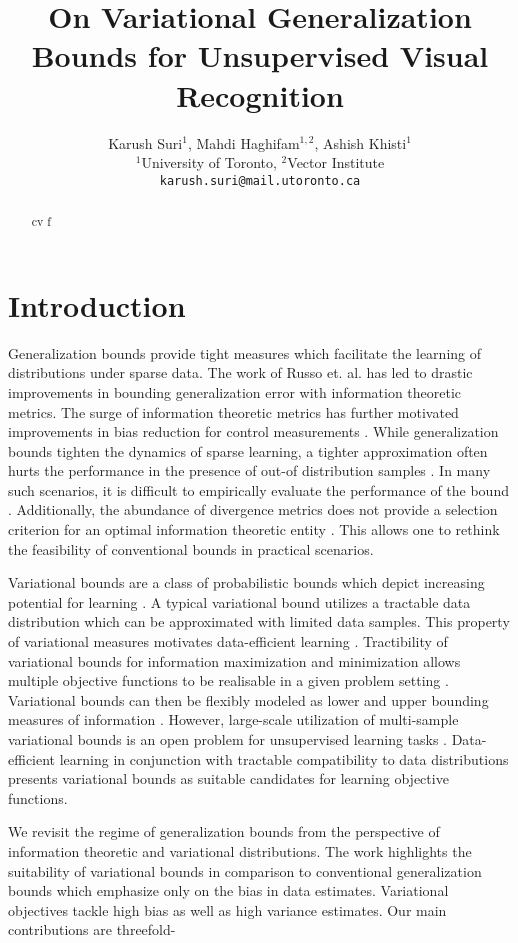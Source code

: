 \documentclass{article}
\title{On Variational Generalization Bounds for Unsupervised Visual Recognition}
\author{
  Karush Suri$^{1}$, Mahdi Haghifam$^{1,2}$, Ashish Khisti$^{1}$\\
   $^{1}$University of Toronto, $^{2}$Vector Institute\\
  \texttt{karush.suri@mail.utoronto.ca}
}
\begin{document}
\maketitle

\begin{abstract}
cv f 
\end{abstract}

\section{Introduction}
Generalization bounds provide tight measures which facilitate the learning of distributions under sparse data. The work of Russo et. al. \cite{russo} has led to drastic improvements \cite{xu,negrea} in bounding generalization error with information theoretic metrics. The surge of information theoretic metrics \cite{xu,bu} has further motivated improvements in bias reduction for control measurements \cite{cotnrol}. While generalization bounds tighten the dynamics of sparse learning, a tighter approximation often hurts the performance in the presence of out-of distribution samples \cite{mine}. In many such scenarios, it is difficult to empirically evaluate the performance of the bound \cite{control}. Additionally, the abundance of divergence metrics does not provide a selection criterion for an optimal information theoretic entity \cite{book, measures}. This allows one to rethink the feasibility of conventional bounds in practical scenarios. 

Variational bounds \cite{variational} are a class of probabilistic bounds which depict increasing potential for learning \cite{mine,visual,cpc}. A typical variational bound utilizes a tractable data distribution which can be approximated with limited data samples. This property of variational measures motivates data-efficient learning \cite{cpcv2}. Tractibility of variational bounds for information maximization and minimization allows multiple objective functions to be realisable in a given problem setting \cite{variational}. Variational bounds can then be flexibly modeled as lower and upper bounding measures of information \cite{variational}. However, large-scale utilization of multi-sample variational bounds is an open problem for unsupervised learning tasks \cite{variational}. Data-efficient learning in conjunction with tractable compatibility to data distributions presents variational bounds as suitable candidates for learning objective functions.

We revisit the regime of generalization bounds from the perspective of information theoretic and variational distributions. The work highlights the suitability of variational bounds in comparison to conventional generalization bounds which emphasize only on the bias in data estimates. Variational objectives tackle high bias as well as high variance estimates. Our main contributions are threefold- 
\end{document}
